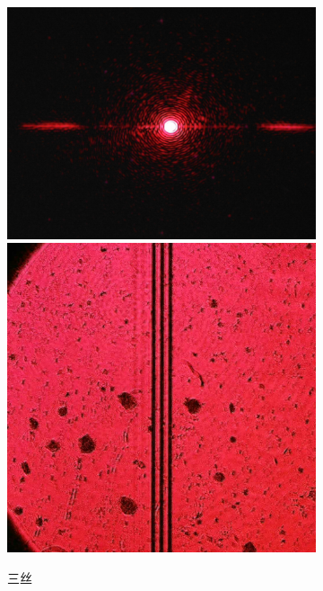 \documentclass[a4paper]{article}
\begin{document}
\begin{figure}[htbp]
\begin{subfigure}[htbp]{0.3\textwidth}
        \centering
        \includegraphics[width=\textwidth]{fre-done/3-6.JPG}
        \includegraphics[width=\textwidth]{img-done/3-6.JPG}
        \caption{三丝}
        \label{3-6}
    \end{subfigure}
    \begin{subfigure}[htbp]{0.3\textwidth}
        \centering

\end{subfigure}
\end{figure}
\end{document}
